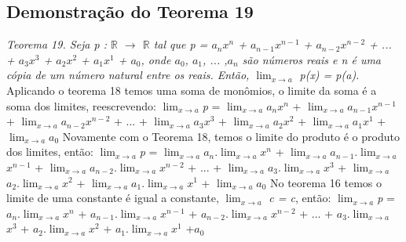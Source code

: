 \subsection{Demonstração do Teorema 19}
\textit{Teorema 19. Seja p : $\mathbb{R}$ $\rightarrow$ $\mathbb{R}$ tal que p = $a_{n}$$x^{n}$ + $a_{n-1}$$x^{n-1}$ + $a_{n-2}$$x^{n-2}$ + ... + $a_{3}$$x^{3}$ + $a_{2}$$x^{2}$ + $a_{1}$$x^{1}$ + $a_{0}$, onde $a_{0}$, $a_{1}$, ... ,$a_{n}$ são números reais e n é uma cópia de um número natural entre os reais. Então, $\lim_{x\rightarrow a}$ p(x) = p(a).}
\newline \newline
Aplicando o teorema 18 temos uma soma de monômios, o limite da soma é a soma dos limites, reescrevendo: \newline
 $\lim_{x\rightarrow a}$\textit{p} = $\lim_{x\rightarrow a}$$a_{n}$$x^{n}$ + $\lim_{x\rightarrow a}$$a_{n-1}$$x^{n-1}$ + $\lim_{x\rightarrow a}$$a_{n-2}$$x^{n-2}$ + ... + $\lim_{x\rightarrow a}$$a_{3}$$x^{3}$ + $\lim_{x\rightarrow a}$$a_{2}$$x^{2}$ + $\lim_{x\rightarrow a}$$a_{1}$$x^{1}$ + $\lim_{x\rightarrow a}$$a_{0}$
\newline \newline
Novamente com o Teorema 18, temos o limite do produto é o produto dos limites, então:  \newline
 $\lim_{x\rightarrow a}$\textit{p} = $\lim_{x\rightarrow a}$$a_{n}$.$\lim_{x\rightarrow a}$$x^{n}$ + $\lim_{x\rightarrow a}$$a_{n-1}$.$\lim_{x\rightarrow a}$$x^{n-1}$ + $\lim_{x\rightarrow a}$$a_{n-2}$.$\lim_{x\rightarrow a}$$x^{n-2}$ + ... \newline+ $\lim_{x\rightarrow a}$$a_{3}$.$\lim_{x\rightarrow a}$$x^{3}$ + $\lim_{x\rightarrow a}$$a_{2}$.$\lim_{x\rightarrow a}$$x^{2}$ + $\lim_{x\rightarrow a}$$a_{1}$.$\lim_{x\rightarrow a}$$x^{1}$ + $\lim_{x\rightarrow a}$$a_{0}$ 
\newline \newline
No teorema 16 temos o limite de uma constante é igual a constante, $\lim_{x\rightarrow a}$ \textit{c = c}, então: 
\newline
 $\lim_{x\rightarrow a}$\textit{p} = $a_{n}$.$\lim_{x\rightarrow a}$$x^{n}$ + $a_{n-1}$.$\lim_{x\rightarrow a}$$x^{n-1}$ + $a_{n-2}$.$\lim_{x\rightarrow a}$$x^{n-2}$ + ... + $a_{3}$.$\lim_{x\rightarrow a}$$x^{3}$ + $a_{2}$.$\lim_{x\rightarrow a}$$x^{2}$ + $a_{1}$.$\lim_{x\rightarrow a}$$x^{1}$ +$a_{0}$ 
\newline \newline
